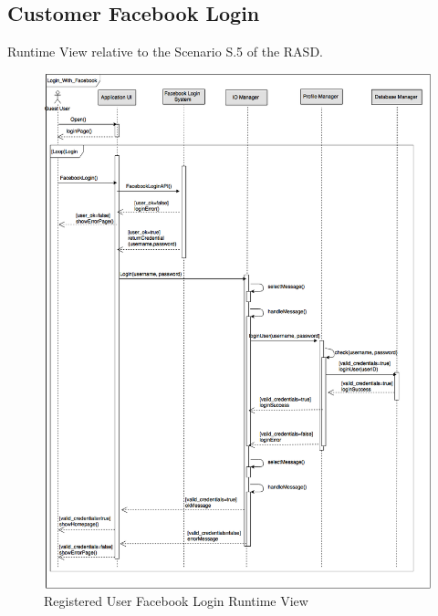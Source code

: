 \documentclass[../../../../../../dd.tex]{subfiles}
\begin{document}
	\subsection{Customer Facebook Login}
		Runtime View relative to the Scenario S.5 of the RASD.
		\begin{figure}[H]
				\centering
				\includegraphics[width=\textwidth, scale=0.5]{../images/SequenceDiagrams/UserLoginFacebook.png}
			\caption{Registered User Facebook Login Runtime View}\label{fig:RegisteredUserLoginFacebook}
		\end{figure}
\end{document}
